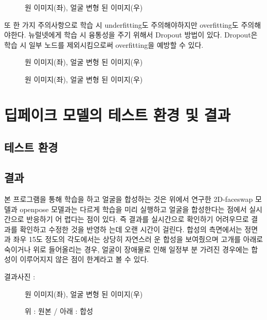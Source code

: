 \begin{figure}[h!]
\centering
\caption{원 이미지(좌), 얼굴 변형 된 이미지(우)}
\end{figure}

또 한 가지 주의사항으로 학습 시 underfitting도 주의해야하지만 overfitting도 주의해야한다. 뉴럴넷에게 학습 시 융통성을 주기 위해서 Dropout 방법이 있다. Dropout은 학습 시 일부 노드를 제외시킴으로써 overfitting을 예방할 수 있다.

\begin{figure}[h!]
\centering
\caption{원 이미지(좌), 얼굴 변형 된 이미지(우)}
\end{figure}

\begin{figure}[h!]
\centering
\caption{원 이미지(좌), 얼굴 변형 된 이미지(우)}
\end{figure}

\section{ 딥페이크 모델의 테스트 환경 및 결과}

\subsection{테스트 환경 }
\spec
\subsection{결과}

본 프로그램을 통해 학습을 하고 얼굴을 합성하는 것은 위에서 연구한 2D-faceswap 모델과  openpose 모델과는 다르게 학습을 미리 실행하고 얼굴을 합성한다는 점에서 실시간으로 반응하기 어 렵다는 점이 있다. 즉 결과를 실시간으로 확인하기 어려우므로 결과를 확인하고 수정한 것을 반영하 는데 오랜 시간이 걸린다. 합성의 측면에서는 정면과 좌우 15도 정도의 각도에서는 상당히 자연스러 운 합성을 보여줬으며 고개를 아래로 숙이거나 위로 들어올리는 경우, 얼굴이 장애물로 인해 일정부 분 가려진 경우에는 합성이 이루어지지 않은 점이 한계라고 볼 수 있다.

결과사진 :

\begin{figure}[h!]
\centering
\caption{원 이미지(좌), 얼굴 변형 된 이미지(우)}
\end{figure}

\begin{figure}[h!]
\centering
\caption{위 : 원본 / 아래 : 합성}
\end{figure}

